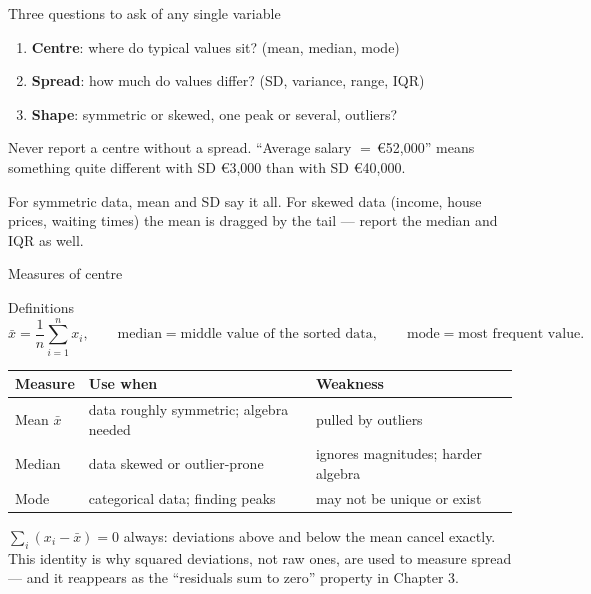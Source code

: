 \documentclass[aspectratio=169,11pt]{beamer}
\begin{document}
\begin{frame}{Three questions to ask of any single variable}
  \begin{takeaway}
    \begin{enumerate}
      \item \textbf{Centre}: where do typical values sit? (mean, median, mode)
      \item \textbf{Spread}: how much do values differ? (SD, variance, range, IQR)
      \item \textbf{Shape}: symmetric or skewed, one peak or several, outliers?
    \end{enumerate}
    Never report a centre without a spread. ``Average salary $=\,$\euro 52{,}000''
    means something quite different with SD \euro 3{,}000 than with SD \euro 40{,}000.
  \end{takeaway}
  \begin{readme}
    For symmetric data, mean and SD say it all. For skewed data (income,
    house prices, waiting times) the mean is dragged by the tail --- report
    the median and IQR as well.
  \end{readme}
\end{frame}

\begin{frame}{Measures of centre}
  \begin{block}{Definitions}
    \[
      \bar x = \frac{1}{n}\sum_{i=1}^{n} x_i,
      \qquad
      \text{median} = \text{middle value of the sorted data},
      \qquad
      \text{mode} = \text{most frequent value.}
    \]
  \end{block}
  \footnotesize
  \begin{tabular}{@{}lll@{}}
    \toprule
    \textbf{Measure} & \textbf{Use when} & \textbf{Weakness} \\
    \midrule
    Mean $\bar x$ & data roughly symmetric; algebra needed & pulled by outliers \\
    Median & data skewed or outlier-prone & ignores magnitudes; harder algebra \\
    Mode & categorical data; finding peaks & may not be unique or exist \\
    \bottomrule
  \end{tabular}
  \begin{takeaway}
    $\sum_i (x_i - \bar x) = 0$ always: deviations above and below the mean
    cancel exactly. This identity is why squared deviations, not raw ones,
    are used to measure spread --- and it reappears as the ``residuals sum to
    zero'' property in Chapter 3.
  \end{takeaway}
\end{frame}
\end{document}
